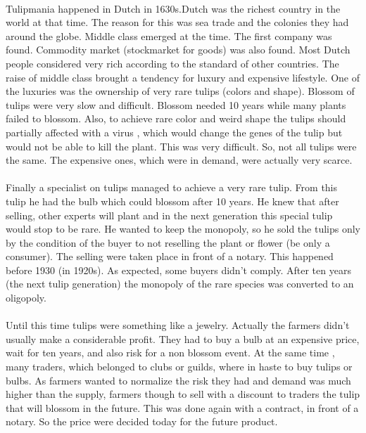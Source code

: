 \documentclass{article}
\begin{document}
\paragraph{ }
Tulipmania happened in Dutch in 1630s.Dutch was the richest country in the world at that time. The reason for this was sea trade and the colonies they had around the globe. Middle class emerged at the time. The first company was found. Commodity market (stockmarket for goods) was also found. Most Dutch people considered very rich according to the standard of other countries. The raise of middle class brought a tendency for luxury and expensive lifestyle. One of the luxuries was the ownership of very rare tulips (colors and shape). Blossom of tulips were very slow and difficult. Blossom needed 10 years while many plants failed to blossom. Also, to achieve rare color and weird shape the tulips should partially affected with a virus , which would change the genes of the tulip but would not be able to kill the plant. This was very difficult. So, not all tulips were the same. The expensive ones, which were in demand, were actually very scarce.
\paragraph{ }
Finally a specialist on tulips managed to achieve a very rare tulip. From this tulip he had the bulb which could blossom after 10 years. He knew that after selling, other experts will plant and in the next generation this special tulip would stop to be rare. He wanted to keep the monopoly, so he sold the tulips only by the condition of the buyer to not reselling the plant or flower (be only a consumer). The selling were taken place in front of a notary. This happened before 1930 (in 1920s). As expected, some buyers didn't comply. After ten years (the next tulip generation) the monopoly of the rare species was converted to an oligopoly.
\paragraph{ }
Until this time tulips were something like a jewelry. Actually the farmers didn't usually make a considerable profit. They had to buy a bulb at an expensive price, wait for ten years, and also risk for a non blossom event. At the same time , many traders, which belonged to clubs or guilds, where in haste to buy tulips or bulbs. As farmers wanted to normalize the risk they had and demand was much higher than the supply, farmers though to sell with a discount to traders the tulip that will blossom in the future. This was done again with a contract, in front of a notary. So the price were decided today for the future product.
\end{document}
